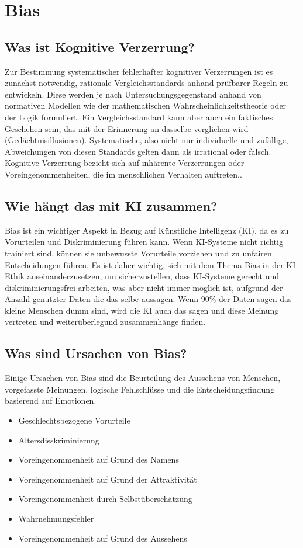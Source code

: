 \section{Bias}
\label{sec:ai}
\subsection{Was ist Kognitive Verzerrung?}

Zur Bestimmung systematischer fehlerhafter kognitiver Verzerrungen 
ist es zunächst notwendig, rationale Vergleichsstandards anhand 
prüfbarer Regeln zu entwickeln. Diese werden je nach Untersuchungsgegenstand 
anhand von normativen Modellen wie der mathematischen Wahrscheinlichkeitstheorie 
oder der Logik formuliert. Ein Vergleichsstandard kann aber auch ein 
faktisches Geschehen sein, das mit der Erinnerung an dasselbe verglichen 
wird (Gedächtnisillusionen). Systematische, also nicht nur individuelle 
und zufällige, Abweichungen von diesen Standards gelten dann als irrational 
oder falsch. Kognitive Verzerrung bezieht sich auf inhärente Verzerrungen oder 
Voreingenommenheiten, die im menschlichen Verhalten auftreten.\citep{Kognitive_Verzerrung}.

\subsection{Wie hängt das mit KI zusammen?}
Bias ist ein wichtiger Aspekt in Bezug auf Künstliche Intelligenz (KI), 
da es zu Vorurteilen und Diskriminierung führen kann. Wenn KI-Systeme nicht 
richtig trainiert sind, können sie unbewusste Vorurteile vorziehen und 
zu unfairen Entscheidungen führen. Es ist daher wichtig, sich mit dem Thema 
Bias in der KI-Ethik auseinanderzusetzen, um sicherzustellen, dass KI-Systeme 
gerecht und diskriminierungsfrei arbeiten, was aber nicht immer möglich ist, 
aufgrund der Anzahl genutzter Daten die das selbe aussagen. Wenn 90\% der Daten 
sagen das kleine Menschen dumm sind, wird die KI auch das sagen und diese Meinung 
vertreten und weiterüberlegund zusammenhänge finden. 

\subsection{Was sind Ursachen von Bias?}
Einige Ursachen von Bias sind die Beurteilung des Aussehens von Menschen, 
vorgefasste Meinungen, logische Fehlschlüsse und die Entscheidungsfindung basierend
auf Emotionen.
\begin{itemize}
    \item Geschlechtsbezogene Vorurteile
    \item Altersdisskriminierung
    \item Voreingenommenheit auf Grund des Namens
    \item Voreingenommenheit auf Grund der Attraktivität
    \item Voreingenommenheit durch Selbstüberschätzung
    \item Wahrnehmungsfehler
    \item Voreingenommenheit auf Grund des Aussehens
\end{itemize} \citep{Ursachen_Bias}

